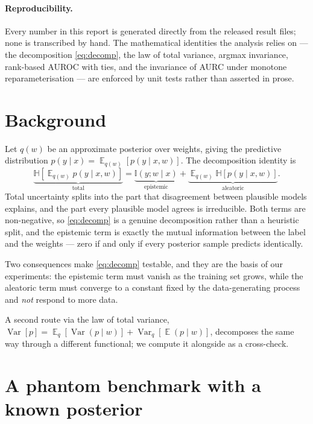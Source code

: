 \documentclass{article}
\DeclareMathOperator*{\E}{\mathbb{E}}
\DeclareMathOperator{\Var}{Var}
\newcommand{\Hent}{\mathbb{H}}
\newcommand{\MI}{\mathbb{I}}
\begin{document}
\paragraph{Reproducibility.} Every number in this report is generated directly
from the released result files; none is transcribed by hand. The mathematical
identities the analysis relies on --- the decomposition
\eqref{eq:decomp}, the law of total variance, argmax invariance, rank-based
AUROC with ties, and the invariance of AURC under monotone reparameterisation ---
are enforced by unit tests rather than asserted in prose.

\section{Background}

Let $q(w)$ be an approximate posterior over weights, giving the predictive
distribution $p(y \mid x) = \E_{q(w)}[p(y \mid x, w)]$. The decomposition
identity is
\begin{equation}
\underbrace{\Hent\!\left[\E_{q(w)} p(y \mid x, w)\right]}_{\text{total}}
= \underbrace{\MI(y ; w \mid x)}_{\text{epistemic}}
+ \underbrace{\E_{q(w)} \Hent\!\left[p(y \mid x, w)\right]}_{\text{aleatoric}} .
\label{eq:decomp}
\end{equation}
Total uncertainty splits into the part that disagreement between plausible models
explains, and the part every plausible model agrees is irreducible. Both terms
are non-negative, so \eqref{eq:decomp} is a genuine decomposition rather than a
heuristic split, and the epistemic term is exactly the mutual information between
the label and the weights --- zero if and only if every posterior sample predicts
identically.

Two consequences make \eqref{eq:decomp} testable, and they are the basis of our
experiments: the epistemic term must vanish as the training set grows, while the
aleatoric term must converge to a constant fixed by the data-generating process
and \emph{not} respond to more data.

A second route via the law of total variance,
$\Var[p] = \E_q[\Var(p \mid w)] + \Var_q[\E(p \mid w)]$, decomposes the same way
through a different functional; we compute it alongside as a cross-check.

\section{A phantom benchmark with a known posterior}
\label{sec:benchmark}
\end{document}

